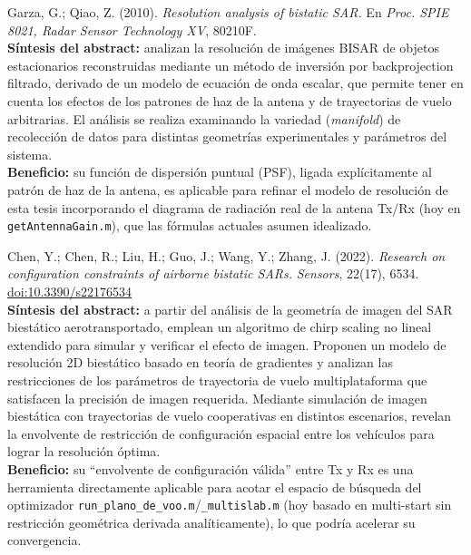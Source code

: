 \documentclass[11pt,a4paper]{article}
\begin{document}
\begin{enumerate}[label=\textbf{[A\arabic*]}, leftmargin=2.2cm, itemsep=10pt]
\item Garza, G.; Qiao, Z. (2010). \textit{Resolution analysis of bistatic
SAR.} En \emph{Proc. SPIE 8021, Radar Sensor Technology XV}, 80210F.
\cite{garza2010}\\
\textbf{Síntesis del abstract:} analizan la resolución de imágenes BISAR de
objetos estacionarios reconstruidas mediante un método de inversión por
backprojection filtrado, derivado de un modelo de ecuación de onda escalar,
que permite tener en cuenta los efectos de los patrones de haz de la antena
y de trayectorias de vuelo arbitrarias. El análisis se realiza examinando
la variedad (\emph{manifold}) de recolección de datos para distintas
geometrías experimentales y parámetros del sistema.\\
\textbf{Beneficio:} su función de dispersión puntual (PSF), ligada
explícitamente al patrón de haz de la antena, es aplicable para refinar el
modelo de resolución de esta tesis incorporando el diagrama de radiación
real de la antena Tx/Rx (hoy en \texttt{getAntennaGain.m}), que las
fórmulas actuales asumen idealizado.

\item Chen, Y.; Chen, R.; Liu, H.; Guo, J.; Wang, Y.; Zhang, J. (2022).
\textit{Research on configuration constraints of airborne bistatic SARs.}
\emph{Sensors}, 22(17), 6534.
\href{https://doi.org/10.3390/s22176534}{doi:10.3390/s22176534}
\cite{chen2022}\\
\textbf{Síntesis del abstract:} a partir del análisis de la geometría de
imagen del SAR biestático aerotransportado, emplean un algoritmo de chirp
scaling no lineal extendido para simular y verificar el efecto de imagen.
Proponen un modelo de resolución 2D biestático basado en teoría de
gradientes y analizan las restricciones de los parámetros de trayectoria de
vuelo multiplataforma que satisfacen la precisión de imagen requerida.
Mediante simulación de imagen biestática con trayectorias de vuelo
cooperativas en distintos escenarios, revelan la envolvente de restricción
de configuración espacial entre los vehículos para lograr la resolución
óptima.\\
\textbf{Beneficio:} su ``envolvente de configuración válida'' entre Tx y Rx
es una herramienta directamente aplicable para acotar el espacio de
búsqueda del optimizador \texttt{run\_plano\_de\_voo.m}/\texttt{\_multislab.m}
(hoy basado en multi-start sin restricción geométrica derivada
analíticamente), lo que podría acelerar su convergencia.

\end{enumerate}
\end{document}
